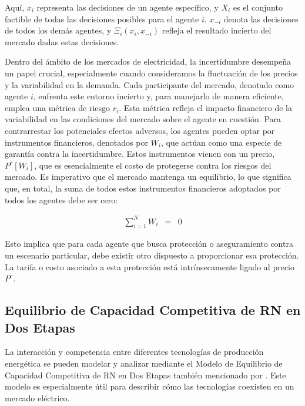 Aquí, \( x_i \) representa las decisiones de un agente específico, y \( X_i \) es el conjunto factible de todas las decisiones posibles para el agente \( i \). \( x_{-i} \) denota las decisiones de todos los demás agentes, y \( \Xi_i(x_i, x_{-i}) \) refleja el resultado incierto del mercado dadas estas decisiones.


\vspace{2.5mm}
Dentro del ámbito de los mercados de electricidad, la incertidumbre desempeña un papel crucial, especialmente cuando consideramos la fluctuación de los precios y la variabilidad en la demanda. Cada participante del mercado, denotado como agente \(i\), enfrenta este entorno incierto y, para manejarlo de manera eficiente, emplea una métrica de riesgo \(r_{i}\). Esta métrica refleja el impacto financiero de la variabilidad en las condiciones del mercado sobre el agente en cuestión. Para contrarrestar los potenciales efectos adversos, los agentes pueden optar por instrumentos financieros, denotados por \(W_i\), que actúan como una especie de garantía contra la incertidumbre. Estos instrumentos vienen con un precio, \(P^{r}[W_i]\), que es esencialmente el costo de protegerse contra los riesgos del mercado. Es imperativo que el mercado mantenga un equilibrio, lo que significa que, en total, la suma de todos estos instrumentos financieros adoptados por todos los agentes debe ser cero:

\begin{eqnarray}
\sum_{i=1}^{N}W_{i} &=& 0\label{eq:fin-eq}    
\end{eqnarray}

Esto implica que para cada agente que busca protección o aseguramiento contra un escenario particular, debe existir otro dispuesto a proporcionar esa protección. La tarifa o costo asociado a esta protección está intrínsecamente ligado al precio \(P^r\).
\vspace{2.5mm}

\subsection{Equilibrio de Capacidad Competitiva de RN en Dos Etapas}\label{C210}

La interacción y competencia entre diferentes tecnologías de producción energética se pueden modelar y analizar mediante el Modelo de Equilibrio de Capacidad Competitiva de RN en Dos Etapas también mencionado por . Este modelo es especialmente útil para describir cómo las tecnologías coexisten en un mercado eléctrico.

